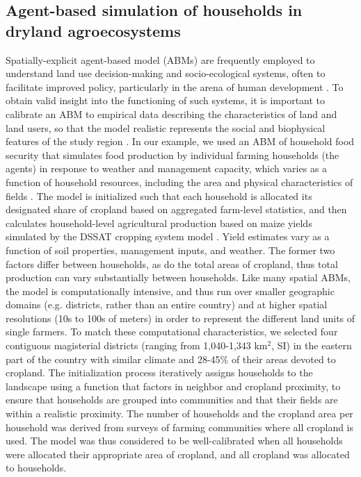 \documentclass{pnastwo2}
\begin{document}
\begin{article}
\subsection{Agent-based simulation of households in dryland agroecosystems}
Spatially-explicit agent-based model (ABMs) are frequently employed to understand land use decision-making and socio-ecological systems, often to facilitate improved policy, particularly in the arena of human development \cite{berger_creating_2006}. To obtain valid insight into the functioning of such systems, it is important to calibrate an ABM to empirical data describing the characteristics of land and land users, so that the model realistic represents the social and biophysical features of the study region \cite{berger_creating_2006}. In our example, we used an ABM of household food security that simulates food production by individual farming households (the agents) in response to weather and management capacity, which varies as a function of household resources, including the area and physical characteristics of fields \cite{chen_dependency_2013}. The model is initialized such that each household is allocated its designated share of cropland based on aggregated farm-level statistics, and then calculates household-level agricultural production based on maize yields simulated by the DSSAT cropping system model \cite{jones_modelling_2003}. Yield estimates vary as a function of soil properties, management inputs, and weather. The former two factors differ between households, as do the total areas of cropland, thus total production can vary substantially between households. Like many spatial ABMs, the model is computationally intensive, and thus run over smaller geographic domains (e.g. districts, rather than an entire country) and at higher spatial resolutions (10s to 100s of meters) in order to represent the different land units of single farmers. To match these computational characteristics, we selected four contiguous magisterial districts (ranging from 1,040-1,343 km$^2$, SI) in the eastern part of the country with similar climate and 28-45\% of their areas devoted to cropland. The initialization process iteratively assigns households to the landscape using a function that factors in neighbor and cropland proximity, to ensure that households are grouped into communities and that their fields are within a realistic proximity. The number of households and the cropland area per household was derived from surveys of farming communities where all cropland is used. The model was thus considered to be well-calibrated when all households were allocated their appropriate area of cropland, and all cropland was allocated to households. 


\end{article}
\end{document}
